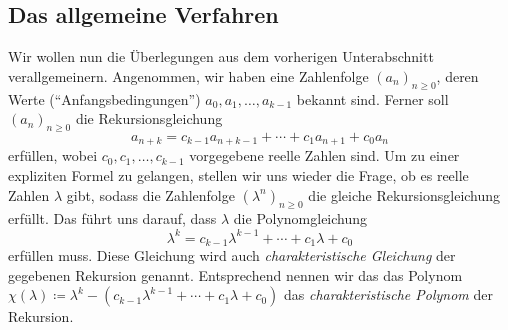 \subsection*{Das allgemeine Verfahren}
Wir wollen nun die Überlegungen aus dem vorherigen Unterabschnitt verallgemeinern. Angenommen, wir haben eine Zahlenfolge $(a_n)_{n\geqslant 0}$, deren Werte (\enquote{Anfangsbedingungen}) $a_0,a_1,\dotsc,a_{k-1}$ bekannt sind. Ferner soll $(a_n)_{n\geqslant 0}$ die Rekursionsgleichung
\begin{equation*}
	a_{n+k}=c_{k-1}a_{n+k-1}+\dotsb+c_1a_{n+1}+c_0a_n
\end{equation*}
erfüllen, wobei $c_0,c_1,\dotsc,c_{k-1}$ vorgegebene reelle Zahlen sind. Um zu einer expliziten Formel zu gelangen, stellen wir uns wieder die Frage, ob es reelle Zahlen $\lambda$ gibt, sodass die Zahlenfolge $(\lambda^n)_{n\geqslant 0}$ die gleiche Rekursionsgleichung erfüllt. Das führt uns darauf, dass $\lambda$ die Polynomgleichung
\begin{equation*}
	\lambda^{k}=c_{k-1}\lambda^{k-1}+\dotsb+c_1\lambda+c_0
\end{equation*}
erfüllen muss. Diese Gleichung wird auch \emph{charakteristische Gleichung} der gegebenen Rekursion genannt. Entsprechend nennen wir das das Polynom $\chi(\lambda)\coloneqq \lambda^k-(c_{k-1}\lambda^{k-1}+\dotsb+c_1\lambda+c_0)$ das \emph{charakteristische Polynom} der Rekursion.

